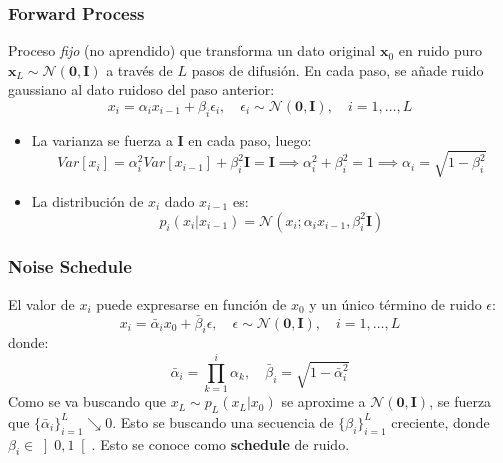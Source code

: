 \documentclass{beamer}
\begin{document}
\begin{frame}
    \frametitle{Forward Process}
    
    Proceso \emph{fijo} (no aprendido) que transforma un dato original $\mathbf{x}_0$ en ruido puro $\mathbf{x}_L\sim \mathcal{N}(\mathbf{0}, \mathbf{I})$ a través de $L$ pasos de difusión.
    \pause
    En cada paso, se añade ruido gaussiano al dato ruidoso del paso anterior:
    \begin{equation*}
        x_i = \alpha_i x_{i-1} + \beta_i \epsilon_i, \quad \epsilon_i \sim \mathcal{N}(\mathbf{0}, \mathbf{I}), \quad i=1,\dots,L
    \end{equation*}
    \pause
    \begin{itemize}
        \item La varianza se fuerza a $\mathbf{I}$ en cada paso, luego:
        \begin{equation*}
            Var[x_i] = \alpha_i^2 Var[x_{i-1}] + \beta_i^2 \mathbf{I} = \mathbf{I} \implies \alpha_i^2 + \beta_i^2 = 1 \implies \alpha_i = \sqrt{1 - \beta_i^2}
        \end{equation*}
        \pause
        \item La distribución de $x_i$ dado $x_{i-1}$ es:
        \begin{equation*}
            p_i(x_i|x_{i-1}) = \mathcal{N}(x_i; \alpha_i x_{i-1}, \beta_i^2 \mathbf{I})
        \end{equation*}
    \end{itemize}
\end{frame}

\begin{frame}
    \frametitle{Noise Schedule}
    
    El valor de $x_i$ puede expresarse en función de $x_0$ y un único término de ruido $\epsilon$:
    \begin{equation*}
        x_i = \bar{\alpha}_i x_0 + \bar{\beta}_i \epsilon, \quad \epsilon \sim \mathcal{N}(\mathbf{0}, \mathbf{I}), \quad i=1,\dots,L
    \end{equation*}
    donde:
    \begin{equation*}
        \bar{\alpha}_i = \prod_{k=1}^{i} \alpha_k, \quad \bar{\beta}_i = \sqrt{1 - \bar{\alpha}_i^2}
    \end{equation*}
    \pause
    Como se va buscando que $x_L\sim p_L(x_L | x_0)$  se aproxime a $\mathcal{N}(\mathbf{0}, \mathbf{I})$, se fuerza que $\{\bar{\alpha}_i\}_{i=1}^L\searrow 0$. Esto se buscando una secuencia de {\color{red}$\{\beta_i\}_{i=1}^L$ creciente, donde $\beta_i\in \left]0, 1\right[$}. Esto se conoce como \textbf{schedule} de ruido.
\end{frame}
\end{document}
